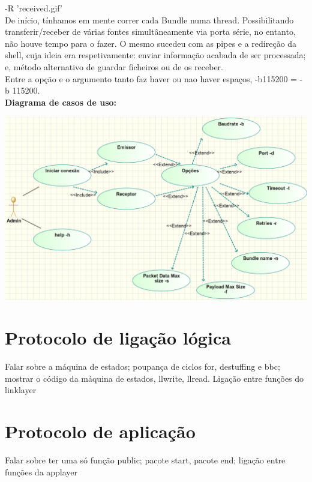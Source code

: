 \documentclass[a4paper]{article}
\begin{document}
-R 'received.gif' \\\newline De início, tínhamos em mente correr cada Bundle
numa thread. Possibilitando transferir/receber de várias fontes simultâneamente
via porta série, no entanto, não houve tempo para o fazer. O mesmo sucedeu com
as pipes e a redireção da shell, cuja ideia era respetivamente: enviar
informação acabada de ser processada; e, método alternativo de guardar
ficheiros ou de os receber.\\Entre a opção e o argumento tanto faz haver ou nao
haver espaços, -b115200 = -b 115200.
\\\newline\textbf{Diagrama de casos de uso:}\\\newline
\centerline{\includegraphics[scale=0.6]{useCases.png}}

\section{Protocolo de ligação lógica}
Falar sobre a máquina de estados; poupança de ciclos for, destuffing e bbc; mostrar o código da máquina de
estados, llwrite, llread. Ligação entre funções do linklayer

\section{Protocolo de aplicação}
Falar sobre ter uma só função public; pacote start, pacote end; ligação entre
funções da applayer
\end{document}
